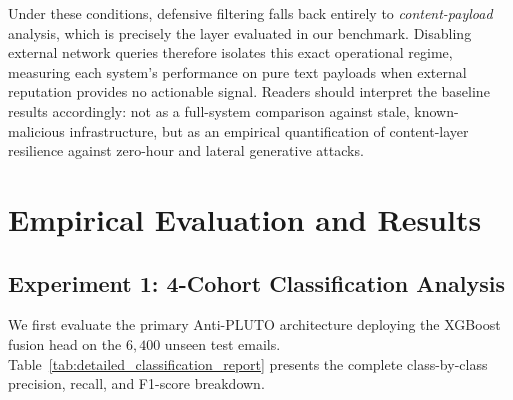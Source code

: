 \documentclass[journal]{IEEEtran}
\begin{document}
Under these conditions, defensive filtering falls back entirely to \emph{content-payload} analysis, which is precisely the layer evaluated in our benchmark. Disabling external network queries therefore isolates this exact operational regime, measuring each system's performance on pure text payloads when external reputation provides no actionable signal. Readers should interpret the baseline results accordingly: not as a full-system comparison against stale, known-malicious infrastructure, but as an empirical quantification of content-layer resilience against zero-hour and lateral generative attacks.



\section{Empirical Evaluation and Results}
\label{sec:results}

\subsection{Experiment 1: 4-Cohort Classification Analysis}
We first evaluate the primary Anti-PLUTO architecture deploying the XGBoost fusion head on the $6,400$ unseen test emails. Table~\ref{tab:detailed_classification_report} presents the complete class-by-class precision, recall, and F1-score breakdown.

\begin{table}[!htbp]
\caption{Anti-PLUTO Detailed 4-Cohort Test Classification Report ($N = 6,400$)}
\label{tab:detailed_classification_report}
\centering
{}
\end{table}
\end{document}
